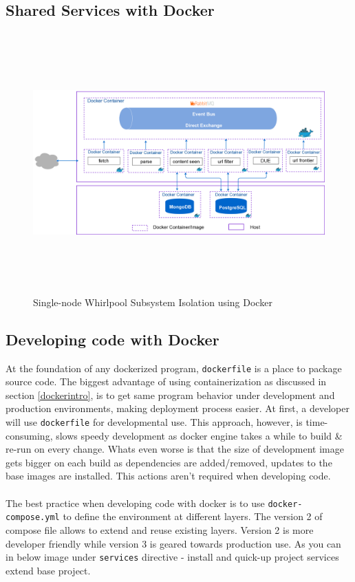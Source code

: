 \subsection{Shared Services with Docker}
\begin{figure}[h!]
  \centering
  \includegraphics[width=18cm,height=10cm,keepaspectratio]{../media/crawler/multi-container-deploy.png}
  \caption{Single-node Whirlpool Subsystem Isolation using Docker}
  \label{fig:multicontainer}
\end{figure}

\pagebreak

\subsection{Developing code with Docker}\label{devdocker}
At the foundation of any dockerized program, \texttt{dockerfile} is a place to package source code. The biggest advantage of using containerization as discussed in section \ref{dockerintro}, is to get same program behavior under development and production environments, making deployment process easier. At first, a developer will use \texttt{dockerfile} for developmental use. This approach, however, is time-consuming, slows speedy development as docker engine takes a while to build \& re-run on every change. Whats even worse is that the size of development image gets bigger on each build as dependencies are added/removed, updates to the base images are installed. This actions aren't required when developing code. 
\\
\\
The best practice when developing code with docker is to use \texttt{docker-compose.yml} to define the environment at different layers. The version 2 of compose file allows to extend and reuse existing layers. Version 2 is more developer friendly while
version 3 is geared towards production use. As you can in below image under
\texttt{services} directive - install and quick-up project services extend base
project.

